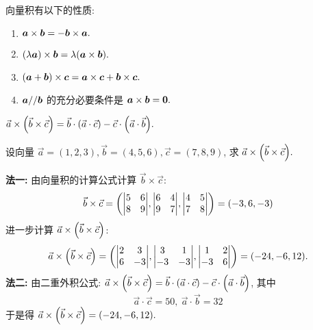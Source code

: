 向量积有以下的性质:
\begin{enumerate}[label=(\arabic{*})]
    \item $\vb*{a} \times \vb*{b}=-\vb*{b} \times \vb*{a} .$
    \item $(\lambda \vb*{a}) \times \vb*{b}=\lambda(\vb*{a} \times \vb*{b}) .$
    \item $(\vb*{a}+\vb*{b}) \times \vb*{c}=\vb*{a} \times \vb*{c}+\vb*{b} \times \vb*{c} .$
    \item $\vb*{a} / / \vb*{b} $ 的充分必要条件是 $ \vb*{a} \times \vb*{b}=\mathbf{0} .$
\end{enumerate}


\begin{theorem}[二重外积公式]
    $\vec{a}\times\qty(\vec{b}\times\vec{c})=\vec{b}\cdot\qty(\vec{a}\cdot\vec{c})-\vec{c}\cdot\qty(\vec{a}\cdot\vec{b}).$
\end{theorem}

\begin{example}[2023 四川大学]
    设向量 $\vec{a}=(1,2,3),\vec{b}=(4,5,6),\vec{c}=(7,8,9)$, 求 $\vec{a}\times\qty(\vec{b}\times\vec{c}).$
\end{example}
\begin{solution}
    \textbf{法一: }由向量积的计算公式计算 $\vec{b}\times\vec{c}$:
    $$\vec{b}\times\vec{c}=\qty(\mqty|5&6\\8&9|,\mqty|6&4\\9&7|,\mqty|4&5\\7&8|)=(-3,6,-3)$$
    进一步计算 $\vec{a}\times\qty(\vec{b}\times\vec{c})$:
    $$\vec{a}\times\qty(\vec{b}\times\vec{c})=\qty(\mqty|2&3\\6&-3|,\mqty|3&1\\-3&-3|,\mqty|1&2\\-3&6|)=(-24,-6,12).$$
    \textbf{法二: }由二重外积公式: $\vec{a}\times\qty(\vec{b}\times\vec{c})=\vec{b}\cdot\qty(\vec{a}\cdot\vec{c})-\vec{c}\cdot\qty(\vec{a}\cdot\vec{b})$, 其中
    $$\vec{a}\cdot\vec{c}=50,~\vec{a}\cdot\vec{b}=32$$
    于是得 $\vec{a}\times\qty(\vec{b}\times\vec{c})=(-24,-6,12).$
\end{solution}

